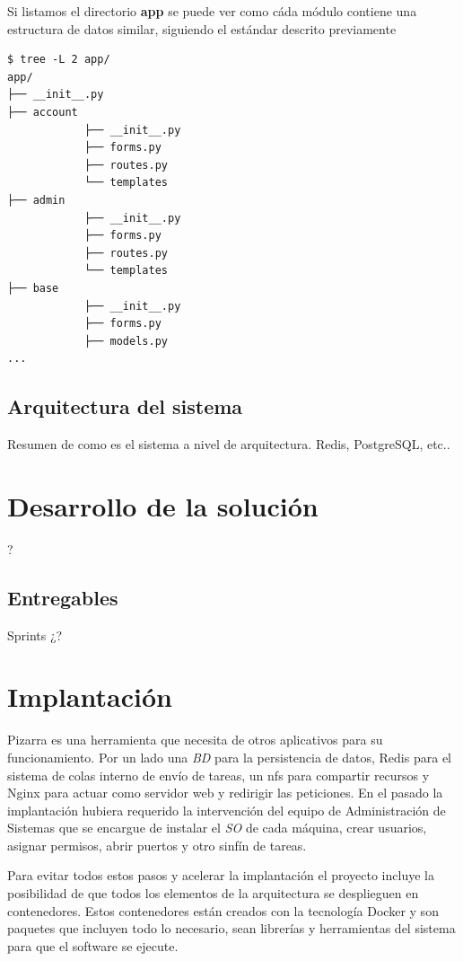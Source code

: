 \documentclass[11pt,spanish,listoffigures,listoftables]{tfgetsinf}
\begin{document}
Si listamos el directorio \textbf{app} se puede ver como cáda módulo contiene una estructura de datos similar, siguiendo el estándar descrito previamente


\begin{lstlisting}[style=ascii-tree]
$ tree -L 2 app/
app/
├── __init__.py
├── account
			├── __init__.py
			├── forms.py
			├── routes.py
			└── templates
├── admin
			├── __init__.py
			├── forms.py
			├── routes.py
			└── templates
├── base
			├── __init__.py
			├── forms.py
			├── models.py
...
\end{lstlisting}

\section{Arquitectura del sistema}

Resumen de como es el sistema a nivel de arquitectura. Redis, PostgreSQL, etc..



\chapter{Desarrollo de la solución}

?

\section{Entregables}

Sprints ¿?

\chapter{Implantación}

Pizarra es una herramienta que necesita de otros aplicativos para su funcionamiento. Por un lado una \textit{BD} para la persistencia de datos, Redis para el sistema de colas interno de envío de tareas, un \acrshort{nfs} para compartir recursos y Nginx para actuar como servidor web y redirigir las peticiones. En el pasado la implantación hubiera requerido la intervención del equipo de Administración de Sistemas que se encargue de instalar el \textit{SO} de cada máquina, crear usuarios, asignar permisos, abrir puertos y otro sinfín de tareas.

Para evitar todos estos pasos y acelerar la implantación el proyecto incluye la posibilidad de que todos los elementos de la arquitectura se desplieguen en \Gls{contenedor}es. Estos \Gls{contenedor}es están creados con la tecnología Docker y son paquetes que incluyen todo lo necesario, sean librerías y herramientas del sistema para que el software se ejecute.
\end{document}
